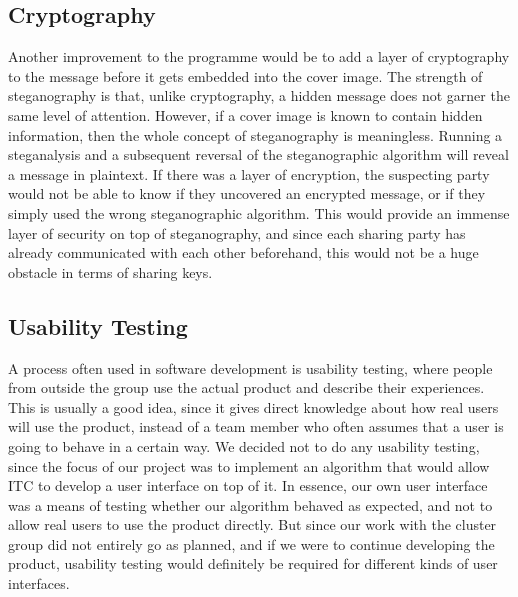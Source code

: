 \subsection{Cryptography}
Another improvement to the programme would be to add a layer of cryptography to the message before it gets embedded into the cover image.
The strength of steganography is that, unlike cryptography, a hidden message does not garner the same level of attention.
However, if a cover image is known to contain hidden information, then the whole concept of steganography is meaningless.
Running a steganalysis and a subsequent reversal of the steganographic algorithm will reveal a message in plaintext.
If there was a layer of encryption, the suspecting party would not be able to know if they uncovered an encrypted message, or if they simply used the wrong steganographic algorithm.
This would provide an immense layer of security on top of steganography, and since each sharing party has already communicated with each other beforehand, this would not be a huge obstacle in terms of sharing keys.

\subsection{Usability Testing}
A process often used in software development is usability testing, where people from outside the group use the actual product and describe their experiences.
This is usually a good idea, since it gives direct knowledge about how real users will use the product, instead of a team member who often assumes that a user is going to behave in a certain way.
We decided not to do any usability testing, since the focus of our project was to implement an algorithm that would allow ITC to develop a user interface on top of it.
In essence, our own user interface was a means of testing whether our algorithm behaved as expected, and not to allow real users to use the product directly.
But since our work with the cluster group did not entirely go as planned, and if we were to continue developing the product, usability testing would definitely be required for different kinds of user interfaces.
